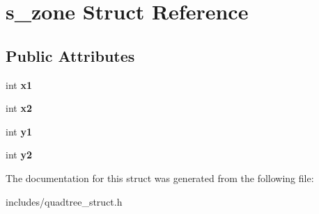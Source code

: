 \hypertarget{structs__zone}{}\section{s\+\_\+zone Struct Reference}
\label{structs__zone}
\subsection*{Public Attributes}
\begin{DoxyCompactItemize}
\item 
\mbox{\label{structs__zone_ab3a02f1a34b2abdd11863d118fba17f8}} 
int {\bfseries x1}
\item 
\mbox{\label{structs__zone_a670943216dec0a0a368dfd0957c79356}} 
int {\bfseries x2}
\item 
\mbox{\label{structs__zone_a4af00be150021a703d708218b1c4d087}} 
int {\bfseries y1}
\item 
\mbox{\label{structs__zone_a8fe569decb1633cf0d75f611839d6d09}} 
int {\bfseries y2}
\end{DoxyCompactItemize}


The documentation for this struct was generated from the following file\+:\begin{DoxyCompactItemize}
\item 
includes/quadtree\+\_\+struct.\+h\end{DoxyCompactItemize}
